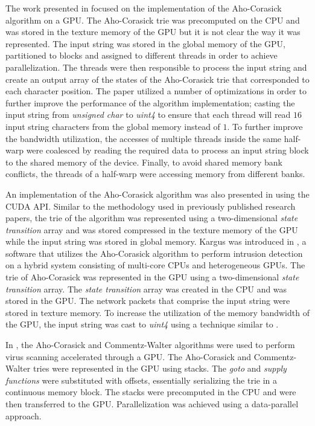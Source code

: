 \documentclass{ws-ijait}
\begin{document}
The work presented in \cite{Zha2011} focused on the implementation of the Aho-Corasick algorithm on a GPU. The Aho-Corasick trie was precomputed on the CPU and was stored in the texture memory of the GPU but it is not clear the way it was represented. The input string was stored in the global memory of the GPU, partitioned to blocks and assigned to different threads in order to achieve parallelization. The threads were then responsible to process the input string and create an output array of the states of the Aho-Corasick trie that corresponded to each character position. The paper utilized a number of optimizations in order to further improve the performance of the algorithm implementation; casting the input string from \textit{unsigned char} to \textit{uint4} to ensure that each thread will read $16$ input string characters from the global memory instead of $1$. To further improve the bandwidth utilization, the accesses of multiple threads inside the same half-warp were coalesced by reading the required data to process an input string block to the shared memory of the device. Finally, to avoid shared memory bank conflicts, the threads of a half-warp were accessing memory from different banks.

An implementation of the Aho-Corasick algorithm was also presented in \cite{Hu2012} using the CUDA API. Similar to the methodology used in previously published research papers, the trie of the algorithm was represented using a two-dimensional \textit{state transition} array and was stored compressed in the texture memory of the GPU while the input string was stored in global memory. Kargus was introduced in \cite{Jamshed2012}, a software that utilizes the Aho-Corasick algorithm to perform intrusion detection on a hybrid system consisting of multi-core CPUs and heterogeneous GPUs. The trie of Aho-Corasick was represented in the GPU using a two-dimensional \textit{state transition} array. The \textit{state transition} array was created in the CPU and was stored in the GPU. The network packets that comprise the input string were stored in texture memory. To increase the utilization of the memory bandwidth of the GPU, the input string was cast to \textit{uint4} using a technique similar to \cite{Zha2011}.

In \cite{Pungila2012}, the Aho-Corasick and Commentz-Walter algorithms were used to perform virus scanning accelerated through a GPU. The Aho-Corasick and Commentz-Walter tries were represented in the GPU using stacks. The \textit{goto} and \textit{supply functions} were substituted with offsets, essentially serializing the trie in a continuous memory block. The stacks were precomputed in the CPU and were then transferred to the GPU. Parallelization was achieved using a data-parallel approach.
\end{document}
